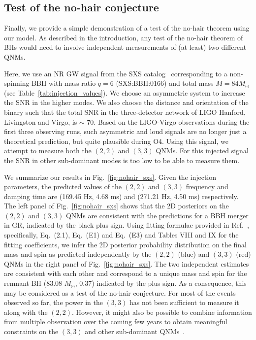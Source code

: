 \documentclass[twocolumn,prd,aps,superscriptaddress,preprintnumbers,tightenlines,showpacs,nofootinbib,eqsecnum,amsfonts,amsmath]{revtex4-1}
\newcommand{\Mo}{M_{\odot}}
\begin{document}
\subsection{Test of the no-hair conjecture}\label{ssec:nohairtheorem}

Finally, we provide a simple demonstration of a test of the no-hair
theorem using our model. As described in the introduction, any test of
the no-hair theorem of BHs would need to involve independent
measurements of (at least) two different QNMs.

Here, we use an NR GW signal from the SXS catalog~\cite{Mroue:2013xna}
corresponding to a non-spinning BBH with mass-ratio $q=6$ (SXS:BBH:0166) and 
total mass $M=84 \Mo$ (see Table~\ref{tab:injection_values}).
We choose an asymmetric system to increase the SNR in the higher modes.
We also choose the distance and orientation of the binary
such that the total SNR in the three-detector network of LIGO Hanford, Livingston and
Virgo, is {$\sim$ 70}. Based on the LIGO-Virgo observations during the first three observing runs, 
such asymmetric and loud signals are no longer just a theoretical
prediction, but quite plausible during O4. Using this
signal, we attempt to measure both the $(2,2)$ and
$(3,3)$ QNMs. For this injected signal the SNR in
other sub-dominant modes is too low to be able to measure them.

We summarize our results in Fig.~\ref{fig:nohair_sxs}.  Given the
injection parameters, the predicted values of the $(2, 2)$ and
$(3, 3)$ frequency and damping time are {(169.45 Hz, 4.68
  ms)} and {(271.21 Hz, 4.50 ms)} respectively. The left panel
of Fig.~\ref{fig:nohair_sxs} shows that the 2D posteriors
on the $(2, 2)$ and $(3, 3)$ QNMs are consistent with the
predictions for a BBH merger in GR, indicated by the black plus sign.
Using fitting formulae provided in Ref.~\cite{Berti:2005ys}, specifically,
Eq.~(2.1), Eq.~(E1) and Eq.~(E3) and Tables VIII and IX for the fitting coefficients,
we infer the 2D posterior probability distribution on the
final mass and spin as predicted independently by the $(2, 2)$ (blue) and $(3, 3)$ (red)
QNMs in the right panel of Fig.~\ref{fig:nohair_sxs}. The two
independent estimates are consistent with each other and correspond to
a unique mass and spin for the remnant BH {(83.08 $\Mo$, 0.37)}
indicated by the plus sign. As a consequence, this may be considered
as a test of the no-hair conjecture. For most of the events observed
so far, the power in the $(3, 3)$ has not been sufficient to
measure it along with the $(2, 2)$. However, it might also be possible to combine information from
multiple observation over the coming few years to obtain meaningful
constraints on the $(3, 3)$ and other sub-dominant QNMs~\cite{Gossan:2011ha,Meidam:2014jpa,Yang:2017zxs}.
\end{document}
